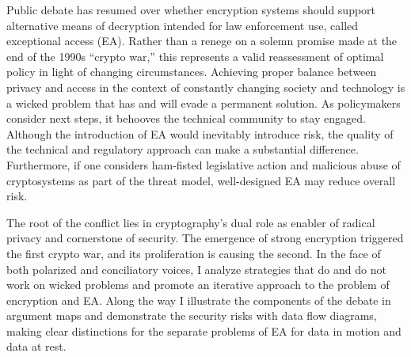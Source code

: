 
Public debate has resumed over whether encryption systems should support alternative means of decryption intended for
law enforcement use, called exceptional access (EA). Rather than a renege on a solemn promise made at the end of the
1990s ``crypto war,'' this represents a valid reassessment of optimal policy in light of changing circumstances.
Achieving proper balance between privacy and access in the context of constantly changing society and technology is a
wicked problem that has and will evade a permanent solution. As policymakers consider next steps, it behooves the
technical community to stay engaged. Although the introduction of EA would inevitably introduce risk, the quality of the
technical and regulatory approach can make a substantial difference. Furthermore, if one considers ham-fisted
legislative action and malicious abuse of cryptosystems as part of the threat model, well-designed EA may reduce overall
risk.

The root of the conflict lies in cryptography's dual role as enabler of radical privacy and cornerstone of security. The
emergence of strong encryption triggered the first crypto war, and its proliferation is causing the second. In the face
of both polarized and conciliatory voices, I analyze strategies that do and do not work on wicked problems and promote
an iterative approach to the problem of encryption and EA. Along the way I illustrate the components of the debate in
argument maps and demonstrate the security risks with data flow diagrams, making clear distinctions for the separate
problems of EA for data in motion and data at rest.
